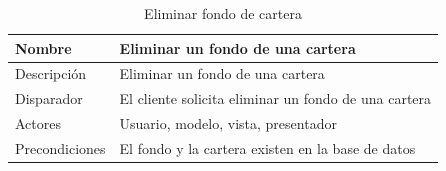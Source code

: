 \documentclass[12pt, a4paper]{book}
\begin{document}
\begin{table}[htbp]
	\centering
	\caption{Eliminar fondo de cartera}
	\label{my-label}
	\begin{tabular}{|l|l|}
		\hline
		Nombre            & Eliminar un fondo de una cartera                                                                                                                                                                                                                                                                                                                                                                                          \\ \hline
		Descripción       & Eliminar un fondo de una cartera                                                                                                                                                                                                                                                                                                                                                                                       \\ \hline
		Disparador        & El cliente solicita eliminar un fondo de una cartera                                                                                                                                                                                                                                                                                                                                                                   \\ \hline
		Actores           & Usuario, modelo, vista, presentador                                                                                                                                                                                                                                                                                                                                                                                    \\ \hline
		Precondiciones    & El fondo y la cartera existen en la base de datos                                                                                                                                                                                                                                                                                                                                                                      \\ \hline

\end{tabular}
\end{table}
\end{document}
